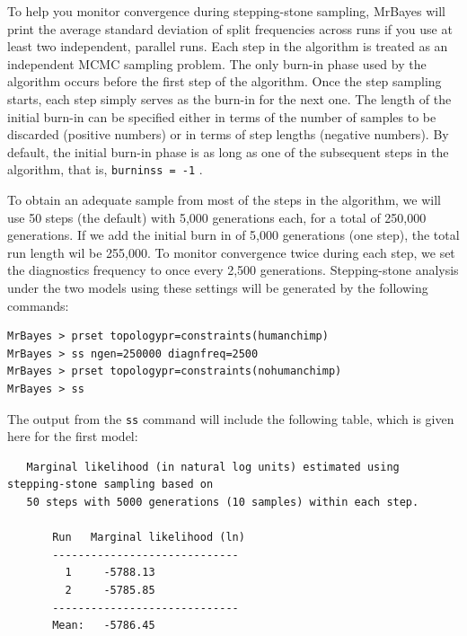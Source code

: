 \documentclass[12pt]{book}
\newcommand{\ttt}[1]{\texttt{#1} }
\begin{document}
To help you monitor convergence during stepping-stone sampling, MrBayes will print the average standard
deviation of split frequencies across runs if you use at least two independent, parallel runs. Each step in the
algorithm is treated as an independent MCMC sampling problem. The only burn-in phase used by the algorithm
occurs before the first step of the algorithm. Once the step sampling starts, each step simply serves as the burn-in
for the next one. The length of the initial burn-in can be specified either in terms of the number of samples to be
discarded (positive numbers) or in terms of step lengths (negative numbers). By default, the initial burn-in phase
is as long as one of the subsequent steps in the algorithm, that is, \ttt{burninss = -1}.

To obtain an adequate sample from most of the steps in the algorithm, we will use 50 steps (the default) with
5,000 generations each, for a total of 250,000 generations. If we add the initial burn in of 5,000 generations
(one step), the total run length wil be 255,000. To monitor convergence twice during each step,
we set the diagnostics frequency to once every 2,500 generations. Stepping-stone analysis under the two
models using these settings will be generated by the following commands:

\begin{singlespacing}
\begin{verbatim}
MrBayes > prset topologypr=constraints(humanchimp)
MrBayes > ss ngen=250000 diagnfreq=2500
MrBayes > prset topologypr=constraints(nohumanchimp)
MrBayes > ss
\end{verbatim}
\end{singlespacing}

The output from the \ttt{ss} command will include the following table, which is given here for the first model:

\scriptsize
\begin{singlespacing}
\begin{verbatim}
   Marginal likelihood (in natural log units) estimated using stepping-stone sampling based on
   50 steps with 5000 generations (10 samples) within each step. 

       Run   Marginal likelihood (ln)
       -----------------------------
         1     -5788.13   
         2     -5785.85   
       -----------------------------
       Mean:   -5786.45
\end{verbatim}
\end{singlespacing}
\normalsize
\end{document}
